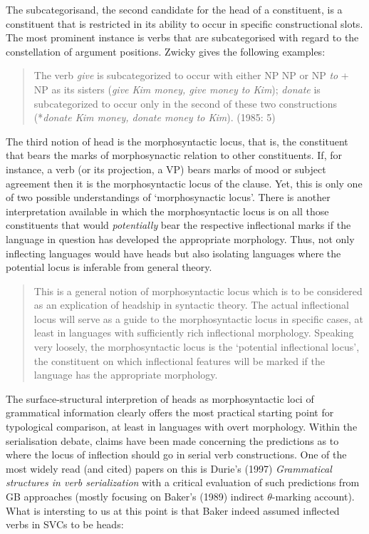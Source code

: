 The subcategorisand, the second candidate for the head of a constituent, is a constituent that is restricted in its ability to occur in specific constructional slots. The most prominent instance is verbs that are subcategorised with regard to the constellation of argument positions. Zwicky gives the following examples:

\begin{quote}
The verb \textit{give} is subcategorized to occur with either NP NP or NP \textit{to} + NP as its sisters (\textit{give Kim money, give money to Kim}); \textit{donate} is subcategorized to occur only in the second of these two constructions (*\textit{donate Kim money, donate money to Kim}). (1985: 5)
\end{quote}

The third notion of head is the morphosyntactic locus, that is, the constituent that bears the marks of morphosynactic relation to other constituents. If, for instance, a verb (or its projection, a VP) bears marks of mood or subject agreement then it is the morphosyntactic locus of the clause. Yet, this is only one of two possible understandings of `morphosynactic locus'. There is another interpretation available in which the morphosyntactic locus is on all those constituents that would \emph{potentially} bear the respective inflectional marks if the language in question has developed the appropriate morphology. Thus, not only inflecting languages would have heads but also isolating languages where the potential locus is inferable from general theory.

\begin{quote}
This is a general notion of morphosyntactic locus which is to be considered as an explication of headship in syntactic theory. The actual inflectional locus will serve as a guide to the morphosyntactic locus in specific cases, at least in languages with sufficiently rich inflectional morphology. Speaking very loosely, the morphosyntactic locus is the `potential inflectional locus', the
constituent on which inflectional features will be marked if the language has the appropriate morphology. 
\end{quote}

The surface-structural interpretion of heads as morphosyntactic loci of grammatical information clearly offers the most practical starting point for typological comparison, at least in languages with overt morphology. Within the serialisation debate, claims have been made concerning the predictions as to where the locus of inflection should go in serial verb constructions. One of the most widely read (and cited) papers on this is Durie's (1997) \textit{Grammatical structures in verb serialization} with a critical evaluation of such predictions from GB approaches (mostly focusing on Baker's (1989) indirect $\theta$-marking account). What is intersting to us at this point is that Baker indeed assumed inflected verbs in SVCs to be heads:

